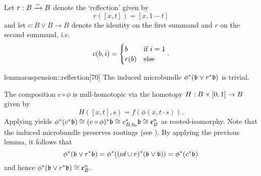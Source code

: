 \begin{myparagraph}
    Let $r: B \isomto B$ denote the `reflection' given by
    \[ r([x, t]) = [x, 1 - t] \]
    and let $c: B \vee B \to B$ denote
    the identity on the first summand and $r$ on the second summand, i.e.
    \[ c(b, i) = \case{b}{r(b)}{i = 1}. \]
\end{myparagraph}

\begin{mystatement}{lemma}{suspension::reflection}[70]
    The induced microbundle $\ind{\phi}(\bb \vee \ind{r}\bb)$ is trivial.
\end{mystatement}

\begin{myproof}
    The composition $c \circ \phi$ is null-homotopic via
    the homotopy $H: B \cross \I \to B$ given by
    \[ H([x, t], s) = f(\phi(x, t \cdot s)). \]
    Applying  yields
    $\ind{\phi}(\ind{c}\bb) \cong \ind{(c \circ \phi)}\bb \cong \ind{c_{B, b_0}}\bb \cong \be{B}$
    as rooted-isomorphy.
    Note that the induced microbundle preserves rootings
    (see ).
    By applying the previous lemma,
    it follows that
    \[ \ind{\phi}(\bb \vee \ind{r}\bb) = \ind{\phi}(\ind{(id \cup r)}(\bb \vee \bb)) = \ind{\phi}(\ind{c}\bb) \]
    and hence $\ind{\phi}(\bb \vee \ind{r}\bb) \cong \be{B}$.
\end{myproof}